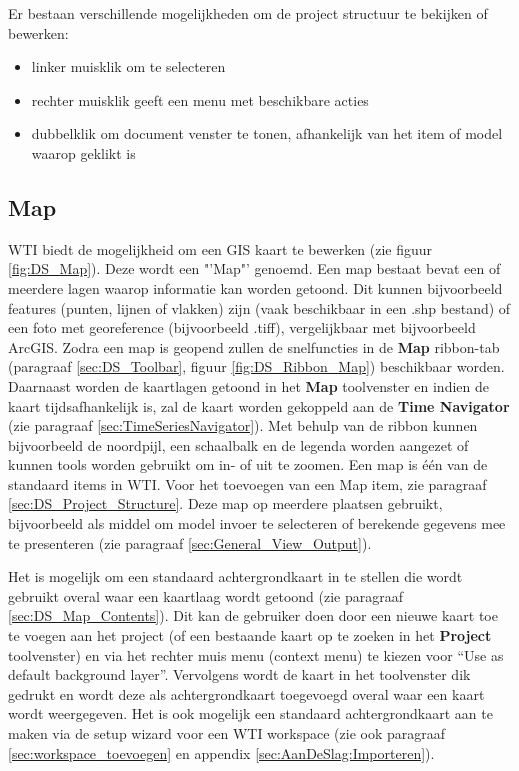 Er bestaan verschillende mogelijkheden om de project structuur te bekijken of bewerken:
\begin{itemize}
\item linker muisklik om te selecteren
\item rechter muisklik geeft een menu met beschikbare acties
\item dubbelklik om document venster te tonen, afhankelijk van het item of model waarop geklikt is
\end{itemize}

\subsection{Map}
	\label{sec:DS_MapView}
WTI biedt de mogelijkheid om een GIS kaart te bewerken (zie figuur \ref{fig:DS_Map}). Deze wordt een "'Map"' genoemd. Een map bestaat bevat een of meerdere lagen waarop informatie kan worden getoond. Dit kunnen bijvoorbeeld features (punten, lijnen of vlakken) zijn (vaak beschikbaar in een .shp bestand) of een foto met georeference (bijvoorbeeld .tiff), vergelijkbaar met bijvoorbeeld ArcGIS. Zodra een map is geopend zullen de snelfuncties in de \textbf{Map} ribbon-tab (paragraaf \ref{sec:DS_Toolbar}, figuur \ref{fig:DS_Ribbon_Map}) beschikbaar worden. Daarnaast worden de kaartlagen getoond in het \textbf{Map} toolvenster en indien de kaart tijdsafhankelijk is, zal de kaart worden gekoppeld aan de \textbf{Time Navigator} (zie paragraaf \ref{sec:TimeSeriesNavigator}). Met behulp van de ribbon kunnen bijvoorbeeld de noordpijl, een schaalbalk en de legenda worden aangezet of kunnen tools worden gebruikt om in- of uit te zoomen. Een map is \'e\'en van de standaard items in WTI. Voor het toevoegen van een Map item, zie paragraaf \ref{sec:DS_Project_Structure}. Deze map op meerdere plaatsen gebruikt, bijvoorbeeld als middel om model invoer te selecteren of berekende gegevens mee te presenteren (zie paragraaf \ref{sec:General_View_Output}). 


Het is mogelijk om een standaard achtergrondkaart in te stellen die wordt gebruikt overal waar een kaartlaag wordt getoond (zie paragraaf \ref{sec:DS_Map_Contents}). Dit kan de gebruiker doen door een nieuwe kaart toe te voegen aan het project (of een bestaande kaart op te zoeken in het \textbf{Project} toolvenster) en via het rechter muis menu (context menu) te kiezen voor "`Use as default background layer"'. Vervolgens wordt de kaart in het toolvenster dik gedrukt en wordt deze als achtergrondkaart toegevoegd overal waar een kaart wordt weergegeven. Het is ook mogelijk een standaard achtergrondkaart aan te maken via de setup wizard voor een WTI workspace (zie ook paragraaf \ref{sec:workspace_toevoegen} en appendix \ref{sec:AanDeSlag:Importeren}).

